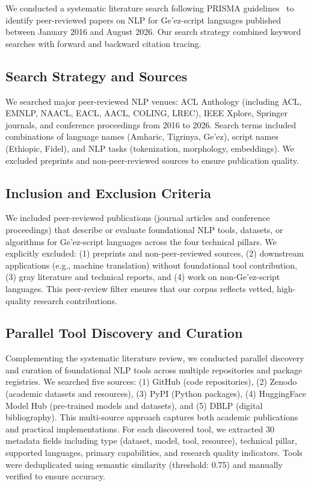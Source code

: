 \documentclass[12pt,a4paper]{article}
\theoremstyle{plain}
\theoremstyle{definition}
\begin{document}
We conducted a systematic literature search following PRISMA guidelines~\cite{moher_preferred_2015} to identify peer-reviewed papers on NLP for Ge'ez-script languages published between January 2016 and August 2026. Our search strategy combined keyword searches with forward and backward citation tracing.

\subsection{Search Strategy and Sources}

We searched major peer-reviewed NLP venues: ACL Anthology (including ACL, EMNLP, NAACL, EACL, AACL, COLING, LREC), IEEE Xplore, Springer journals, and conference proceedings from 2016 to 2026. Search terms included combinations of language names (Amharic, Tigrinya, Ge'ez), script names (Ethiopic, Fidel), and NLP tasks (tokenization, morphology, embeddings). We excluded preprints and non-peer-reviewed sources to ensure publication quality.

\subsection{Inclusion and Exclusion Criteria}

We included peer-reviewed publications (journal articles and conference proceedings) that describe or evaluate foundational NLP tools, datasets, or algorithms for Ge'ez-script languages across the four technical pillars. We explicitly excluded: (1) preprints and non-peer-reviewed sources, (2) downstream applications (e.g., machine translation) without foundational tool contribution, (3) gray literature and technical reports, and (4) work on non-Ge'ez-script languages. This peer-review filter ensures that our corpus reflects vetted, high-quality research contributions.

\subsection{Parallel Tool Discovery and Curation}

Complementing the systematic literature review, we conducted parallel discovery and curation of foundational NLP tools across multiple repositories and package registries. We searched five sources: (1) GitHub (code repositories), (2) Zenodo (academic datasets and resources), (3) PyPI (Python packages), (4) HuggingFace Model Hub (pre-trained models and datasets), and (5) DBLP (digital bibliography). This multi-source approach captures both academic publications and practical implementations. For each discovered tool, we extracted 30 metadata fields including type (dataset, model, tool, resource), technical pillar, supported languages, primary capabilities, and research quality indicators. Tools were deduplicated using semantic similarity (threshold: 0.75) and manually verified to ensure accuracy.
\end{document}
